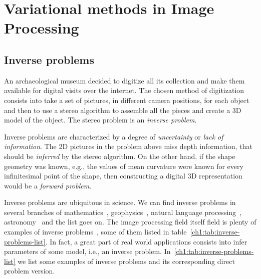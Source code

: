 \chapter{Variational methods in Image Processing}
\label{chapter:variational-methods-in-image-processing}

\section{Inverse problems}

An archaeological museum decided to digitize all its collection and make them available for digital visits over the internet. The chosen method of digitization consists into take a set of pictures, in different camera positions, for each object and then to use a stereo algorithm to assemble all the pieces and create a 3D model of the object. The stereo problem is an \emph{inverse problem}.

Inverse problems are characterized by a degree of \emph{uncertainty} or \emph{lack of information}. The 2D pictures in the problem above miss depth information, that should be \emph{inferred} by the stereo algorithm. On the other hand, if the shape geometry was known, e.g., the values of mean curvature were known for every infinitesimal point of the shape, then constructing a digital 3D representation would be a \emph{forward problem}. 

Inverse problems are ubiquitous in science. We can find inverse problems in several branches of mathematics~\cite{kirsch96}, geophysics~\cite{zhdanov15}, natural language processing~\cite{stroppa05}, astronomy~\cite{lucy94} and the list goes on. The image processing field itself field is plenty of examples of inverse problems~\cite{bertero98}, some of them listed in table~\cref{ch1:tab:inverse-problems-list}. In fact, a great part of real world applications consists into infer parameters of some model, i.e., an inverse problem. In~\cref{ch1:tab:inverse-problems-list} we list some examples of inverse problems and its corresponding direct problem version.

